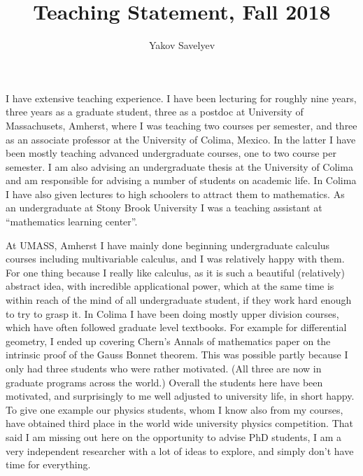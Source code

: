 \documentclass{amsart}
\title {Teaching Statement, Fall 2018}
\author{Yakov Savelyev}
\begin{document}
  

\maketitle
\thispagestyle{plain} 
I have extensive teaching experience.
I have been lecturing for roughly nine years, three years as a graduate student, three as a
postdoc at University of Massachusets, Amherst, where I was
teaching two courses per semester, and three as an associate professor at the University of Colima, Mexico.
In the latter I have been mostly teaching advanced undergraduate courses, one to two course per semester. I am also advising an undergraduate thesis 
at the University of Colima and am responsible for advising a number of students on academic life. In Colima I have also given lectures to high schoolers to attract them to mathematics.
As an undergraduate at Stony Brook University
I was a teaching assistant at
``mathematics learning center''.  

At UMASS, Amherst I have mainly done beginning undergraduate calculus courses including
multivariable calculus, and I was
relatively happy with them. For one thing because I really like
calculus, as it is such a beautiful (relatively) abstract idea, with 
incredible applicational power, which at the same time is within reach of the
mind of all undergraduate student, if they work hard enough
to try to grasp it.  In Colima I have been doing mostly upper division courses, which have often followed graduate level textbooks. For example for differential geometry, I ended up covering Chern's Annals of mathematics paper on the intrinsic proof of the Gauss Bonnet theorem.  This was possible partly because I only had three students who were rather motivated. (All three are now in graduate programs across the world.)
Overall the students here have been motivated, and surprisingly to me well adjusted to university life, in short happy. To give one example our physics students, whom I know also from my courses, have obtained third place in the world wide university physics competition.
That said I am missing out here on the opportunity to advise PhD students, I am a very independent researcher with a lot of ideas to explore, and simply don't have time for everything.
\end{document}
